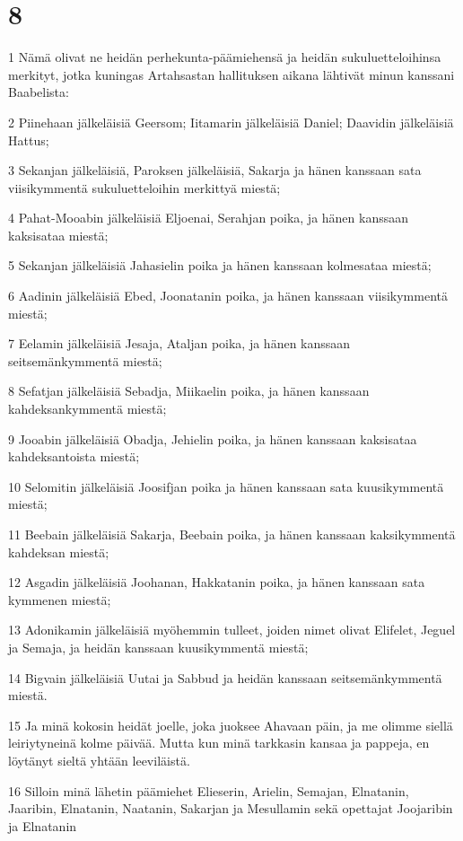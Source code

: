 \chapter{8}

\par 1 Nämä olivat ne heidän perhekunta-päämiehensä ja heidän sukuluetteloihinsa merkityt, jotka kuningas Artahsastan hallituksen aikana lähtivät minun kanssani Baabelista:
\par 2 Piinehaan jälkeläisiä Geersom; Iitamarin jälkeläisiä Daniel; Daavidin jälkeläisiä Hattus;
\par 3 Sekanjan jälkeläisiä, Paroksen jälkeläisiä, Sakarja ja hänen kanssaan sata viisikymmentä sukuluetteloihin merkittyä miestä;
\par 4 Pahat-Mooabin jälkeläisiä Eljoenai, Serahjan poika, ja hänen kanssaan kaksisataa miestä;
\par 5 Sekanjan jälkeläisiä Jahasielin poika ja hänen kanssaan kolmesataa miestä;
\par 6 Aadinin jälkeläisiä Ebed, Joonatanin poika, ja hänen kanssaan viisikymmentä miestä;
\par 7 Eelamin jälkeläisiä Jesaja, Ataljan poika, ja hänen kanssaan seitsemänkymmentä miestä;
\par 8 Sefatjan jälkeläisiä Sebadja, Miikaelin poika, ja hänen kanssaan kahdeksankymmentä miestä;
\par 9 Jooabin jälkeläisiä Obadja, Jehielin poika, ja hänen kanssaan kaksisataa kahdeksantoista miestä;
\par 10 Selomitin jälkeläisiä Joosifjan poika ja hänen kanssaan sata kuusikymmentä miestä;
\par 11 Beebain jälkeläisiä Sakarja, Beebain poika, ja hänen kanssaan kaksikymmentä kahdeksan miestä;
\par 12 Asgadin jälkeläisiä Joohanan, Hakkatanin poika, ja hänen kanssaan sata kymmenen miestä;
\par 13 Adonikamin jälkeläisiä myöhemmin tulleet, joiden nimet olivat Elifelet, Jeguel ja Semaja, ja heidän kanssaan kuusikymmentä miestä;
\par 14 Bigvain jälkeläisiä Uutai ja Sabbud ja heidän kanssaan seitsemänkymmentä miestä.
\par 15 Ja minä kokosin heidät joelle, joka juoksee Ahavaan päin, ja me olimme siellä leiriytyneinä kolme päivää. Mutta kun minä tarkkasin kansaa ja pappeja, en löytänyt sieltä yhtään leeviläistä.
\par 16 Silloin minä lähetin päämiehet Elieserin, Arielin, Semajan, Elnatanin, Jaaribin, Elnatanin, Naatanin, Sakarjan ja Mesullamin sekä opettajat Joojaribin ja Elnatanin

